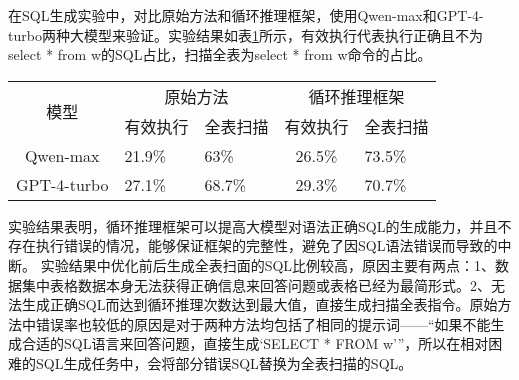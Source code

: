 在SQL生成实验中，对比原始方法和循环推理框架，使用Qwen-max和GPT-4-turbo两种大模型来验证。实验结果如表\ref{tab:sql-generation-comparison}所示，有效执行代表执行正确且不为select * from w的SQL占比，扫描全表为select * from w命令的占比。
\begin{table}[htbp]
    \centering
    \label{tab:sql-generation-comparison}
    \setlength{\tabcolsep}{10pt} %
    \renewcommand{\arraystretch}{1.5} %
    \begin{tabularx}{\textwidth}{@{}cXXcX@{}}
        \toprule[1.5pt]
        \multirow{2}{*}{{模型}} & \multicolumn{2}{c}{{原始方法}} & \multicolumn{2}{c}{{循环推理框架}} \\
        \cmidrule(lr){2-3} \cmidrule(lr){4-5}
        & 有效执行 & 全表扫描 & 有效执行 & 全表扫描 \\
        \midrule[1pt]
        Qwen-max & 21.9\% & 63\% & 26.5\% & 73.5\% \\
        GPT-4-turbo & 27.1\% & 68.7\% & 29.3\% & 70.7\% \\
        \bottomrule[1.5pt]
    \end{tabularx}
\end{table}
实验结果表明，循环推理框架可以提高大模型对语法正确SQL的生成能力，并且不存在执行错误的情况，能够保证框架的完整性，避免了因SQL语法错误而导致的中断。
实验结果中优化前后生成全表扫面的SQL比例较高，原因主要有两点：1、数据集中表格数据本身无法获得正确信息来回答问题或表格已经为最简形式。2、无法生成正确SQL而达到循环推理次数达到最大值，直接生成扫描全表指令。原始方法中错误率也较低的原因是对于两种方法均包括了相同的提示词——“如果不能生成合适的SQL语言来回答问题，直接生成‘SELECT * FROM w’”，所以在相对困难的SQL生成任务中，会将部分错误SQL替换为全表扫描的SQL。

